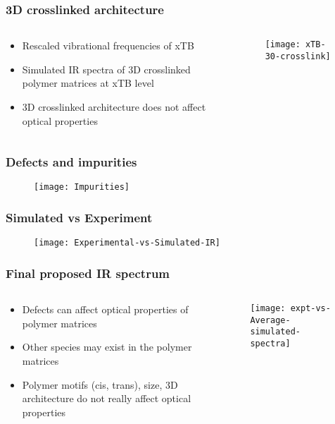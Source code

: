 \documentclass[xcolor=table,aspectratio=169]{beamer}
\begin{document}
\begin{frame}
	\frametitle{3D crosslinked architecture}
	\begin{columns}
		\begin{column}{0.5\textwidth}
			\begin{itemize}
				\item Rescaled vibrational frequencies of xTB
				\item Simulated IR spectra of 3D crosslinked polymer matrices at xTB level
				\item 3D crosslinked architecture does not affect optical properties
			\end{itemize}
		\end{column}
		\hspace{-1.5cm}
		\begin{column}{0.7\textwidth}
			\vspace{0.5mm}
			\begin{figure}
				\texttt{[image: xTB-30-crosslink]}
			\end{figure}
		\end{column}
	\end{columns}
\end{frame}

\begin{frame}
	\frametitle{Defects and impurities}
	\begin{figure}
		\texttt{[image: Impurities]}
	\end{figure}
\end{frame}

\begin{frame}
	\frametitle{Simulated vs Experiment}
	\begin{figure}
		\texttt{[image: Experimental-vs-Simulated-IR]}
	\end{figure}
\end{frame}

\begin{frame}
	\frametitle{Final proposed IR spectrum}
	\begin{columns}
		\begin{column}{0.5\textwidth}
			\begin{itemize}
				\item Defects can affect optical properties of polymer matrices
				\item Other species may exist in the polymer matrices
				\item Polymer motifs (cis, trans), size, 3D architecture do not really affect optical properties
			\end{itemize}
		\end{column}
		\begin{column}{0.6\textwidth}
			\vspace{0.5mm}
			\begin{figure}
				\texttt{[image: expt-vs-Average-simulated-spectra]}
			\end{figure}
		\end{column}
	\end{columns}
\end{frame}
\end{document}
